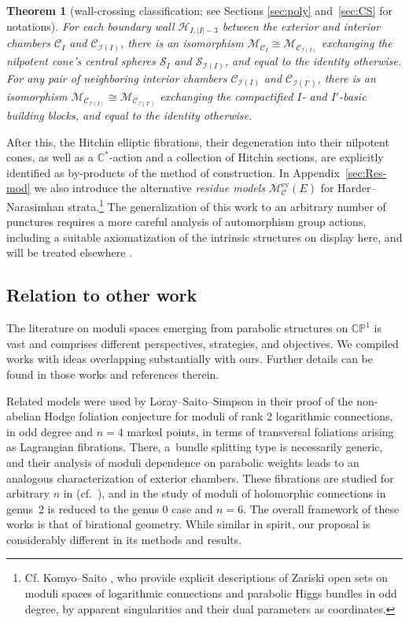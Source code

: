 \documentclass[10pt,a4paper]{amsart}
\newcommand{\field}[1]{\ensuremath{\mathbb{#1}}}
\newcommand{\CC}{\field{C}}
\newcommand{\PP}{\field{P}}
\newcommand{\curly}[1]{\mathscr{#1}}
\newcommand{\cM}{\curly{M}}
\newcommand{\cS}{\curly{S}}
\newcommand{\qC}{\mathcal{C}}
\newcommand{\qH}{\mathcal{H}}
\newcommand{\qI}{\mathcal{I}}
\numberwithin{equation}{section}
\newtheorem{Theorem}{Theorem}[section]
\begin{document}
\begin{Theorem}[wall-crossing classification; see Sections \ref{sec:poly} and~\ref{sec:CS} for notations]\label{theo:main-3}
For each boundary wall $\qH_{I,\vert I\vert -3}$ between the exterior and interior chambers $\qC_{I}$ and $\qC_{\qI(I)}$, there is an isomorphism $\cM_{\qC_{I}} \cong \cM_{\qC_{\qI(I)}}$ exchanging the nilpotent cone's central spheres $\cS_{I}$ and $\cS_{\qI(I)}$, and equal to the identity otherwise. For any pair of neighboring interior chambers $\qC_{\qI(I)}$ and $\qC_{\qI(I')}$, there is an isomorphism $\cM_{\qC_{\qI(I)}} \cong \cM_{\qC_{\qI(I')}}$ exchanging the compactified $I$- and $I'$-basic building blocks, and equal to the identity otherwise.
\end{Theorem}



After this, the Hitchin elliptic fibrations, their degeneration into their nilpotent cones, as well as a $\CC^{*}$-action and a collection of Hitchin sections, are explicitly identified as by-products of the method of construction. In Appendix~\ref{sec:Res-mod} we also introduce the alternative \textit{residue models} $\cM^{\mathrm{ev}}_{\qC}(E)$ for Harder--Narasimhan
strata.\footnote{Cf. Komyo--Saito \cite{KS19}, who provide explicit descriptions of Zariski open sets on moduli spaces of logarithmic connections and parabolic Higgs bundles in odd degree, by apparent singularities and their dual parameters as coordinates.} The generalization of this work to an arbitrary number of punctures requires a more careful analysis of automorphism group actions, including a suitable axiomatization of the intrinsic structures on display here, and will be treated elsewhere \cite{Mena}.




\subsection{Relation to other work}
The literature on moduli spaces emerging from parabolic structures on $\CC\PP^{1}$ is vast and comprises different perspectives, strategies, and objectives. We compiled works with ideas overlapping substantially with ours. Further details can be found in those works and references therein.

Related models were used by
Loray--Saito--Simpson \cite{LSS13}
in their proof of the non-abelian Hodge foliation conjecture for moduli of rank 2 logarithmic connections, in odd degree and $n=4$ marked points, in terms of transversal foliations arising as Lagrangian fibrations. There, a~bundle splitting type is necessarily generic, and their analysis of moduli dependence on parabolic weights leads to an analogous characterization of exterior chambers. These fibrations are studied for arbitrary $n$ in \cite{LS15} (cf.~\cite{KS19}), and in \cite{HL19} the study of moduli of holomorphic connections in genus~2 is reduced to the genus 0 case and $n=6$. The overall framework of these works is that of birational geometry. While similar in spirit, our proposal is considerably different in its methods and results.
\end{document}
